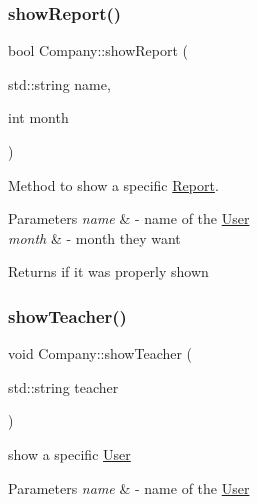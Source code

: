 \subsubsection{\texorpdfstring{show\+Report()}{showReport()}}
{\footnotesize\ttfamily bool Company\+::show\+Report (\begin{DoxyParamCaption}\item[{std\+::string}]{name,  }\item[{int}]{month }\end{DoxyParamCaption})}



Method to show a specific \mbox{\hyperlink{class_report}{Report}}. 


\begin{DoxyParams}{Parameters}
{\em name} & -\/ name of the \mbox{\hyperlink{class_user}{User}} \\
\hline
{\em month} & -\/ month they want \\
\hline
\end{DoxyParams}
\begin{DoxyReturn}{Returns}
if it was properly shown 
\end{DoxyReturn}
\mbox{\label{class_company_aa64ff74648761cfe39d4a9fb0c72031f}} 
\subsubsection{\texorpdfstring{show\+Teacher()}{showTeacher()}}
{\footnotesize\ttfamily void Company\+::show\+Teacher (\begin{DoxyParamCaption}\item[{std\+::string}]{teacher }\end{DoxyParamCaption})}



show a specific \mbox{\hyperlink{class_user}{User}} 


\begin{DoxyParams}{Parameters}
{\em name} & -\/ name of the \mbox{\hyperlink{class_user}{User}} \\
\hline
\end{DoxyParams}
\mbox{\label{class_company_aef95f2feab286505091c38db23cd1c90}} 
